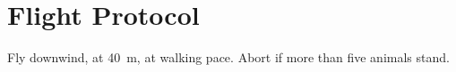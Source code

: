 \section{Flight Protocol}
\label{app:protocol}
Fly downwind, at \SI{40}{m}, at walking pace. Abort if more than five animals stand.
